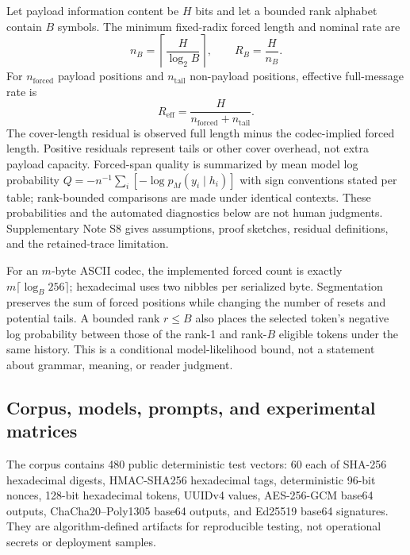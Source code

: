 \documentclass[fleqn,10pt]{wlscirep}
\begin{document}
Let payload information content be \(H\) bits and let a bounded rank alphabet contain \(B\) symbols. The minimum fixed-radix forced length and nominal rate are
\begin{equation}
n_B=\left\lceil\frac{H}{\log_2 B}\right\rceil,\qquad R_B=\frac{H}{n_B}.
\label{eq:capacity}
\end{equation}
For \(n_{\mathrm{forced}}\) payload positions and \(n_{\mathrm{tail}}\) non-payload positions, effective full-message rate is
\begin{equation}
R_{\mathrm{eff}}=\frac{H}{n_{\mathrm{forced}}+n_{\mathrm{tail}}}.
\label{eq:effective-rate}
\end{equation}
The cover-length residual is observed full length minus the codec-implied forced length. Positive residuals represent tails or other cover overhead, not extra payload capacity. Forced-span quality is summarized by mean model log probability \(Q=-n^{-1}\sum_i[-\log p_M(y_i\mid h_i)]\) with sign conventions stated per table; rank-bounded comparisons are made under identical contexts. These probabilities and the automated diagnostics below are not human judgments. Supplementary Note S8 gives assumptions, proof sketches, residual definitions, and the retained-trace limitation.

For an \(m\)-byte ASCII codec, the implemented forced count is exactly \(m\lceil\log_B256\rceil\); hexadecimal uses two nibbles per serialized byte. Segmentation preserves the sum of forced positions while changing the number of resets and potential tails. A bounded rank \(r\leq B\) also places the selected token's negative log probability between those of the rank-1 and rank-\(B\) eligible tokens under the same history. This is a conditional model-likelihood bound, not a statement about grammar, meaning, or reader judgment.

\subsection*{Corpus, models, prompts, and experimental matrices}\label{sec:design-method}

The corpus contains 480 public deterministic test vectors: 60 each of SHA-256 hexadecimal digests, HMAC-SHA256 hexadecimal tags, deterministic 96-bit nonces, 128-bit hexadecimal tokens, UUIDv4 values, AES-256-GCM base64 outputs, ChaCha20--Poly1305 base64 outputs, and Ed25519 base64 signatures\cite{NIST2015SecureHashStandard,Krawczyk1997RFC2104,NIST2007GCM,NirLangley2018RFC8439,JosefssonLiusvaara2017RFC8032,Josefsson2006RFC4648,DavisPeabodyLeach2024RFC9562}. They are algorithm-defined artifacts for reproducible testing, not operational secrets or deployment samples.
\end{document}
